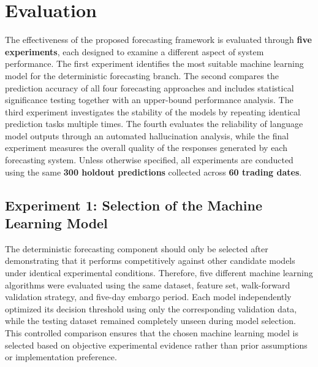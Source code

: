 \section{Evaluation}\label{sec:evaluation}

The effectiveness of the proposed forecasting framework is evaluated
through \textbf{five experiments}, each designed to examine a different
aspect of system performance. The first experiment identifies the most
suitable machine learning model for the deterministic forecasting
branch. The second compares the prediction accuracy of all four
forecasting approaches and includes statistical significance testing
together with an upper-bound performance analysis. The third experiment
investigates the stability of the models by repeating identical
prediction tasks multiple times. The fourth evaluates the reliability of
language model outputs through an automated hallucination analysis,
while the final experiment measures the overall quality of the responses
generated by each forecasting system. Unless otherwise specified, all
experiments are conducted using the same \textbf{300 holdout
predictions} collected across \textbf{60 trading dates}.

\subsection{Experiment 1: Selection of the Machine Learning Model}\label{sec:ml-selection}

The deterministic forecasting component should only be selected after
demonstrating that it performs competitively against other candidate
models under identical experimental conditions. Therefore, five
different machine learning algorithms were evaluated using the same
dataset, feature set, walk-forward validation strategy, and five-day
embargo period. Each model independently optimized its decision
threshold using only the corresponding validation data, while the
testing dataset remained completely unseen during model selection. This
controlled comparison ensures that the chosen machine learning model is
selected based on objective experimental evidence rather than prior
assumptions or implementation preference.

